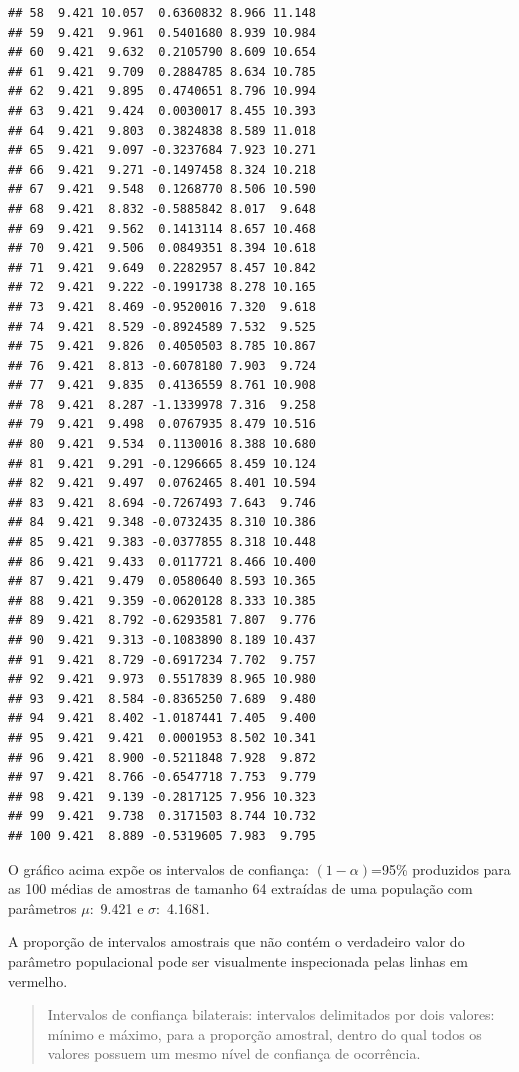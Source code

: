 \documentclass[
]{book}
\begin{document}
\begin{verbatim}
## 58  9.421 10.057  0.6360832 8.966 11.148
## 59  9.421  9.961  0.5401680 8.939 10.984
## 60  9.421  9.632  0.2105790 8.609 10.654
## 61  9.421  9.709  0.2884785 8.634 10.785
## 62  9.421  9.895  0.4740651 8.796 10.994
## 63  9.421  9.424  0.0030017 8.455 10.393
## 64  9.421  9.803  0.3824838 8.589 11.018
## 65  9.421  9.097 -0.3237684 7.923 10.271
## 66  9.421  9.271 -0.1497458 8.324 10.218
## 67  9.421  9.548  0.1268770 8.506 10.590
## 68  9.421  8.832 -0.5885842 8.017  9.648
## 69  9.421  9.562  0.1413114 8.657 10.468
## 70  9.421  9.506  0.0849351 8.394 10.618
## 71  9.421  9.649  0.2282957 8.457 10.842
## 72  9.421  9.222 -0.1991738 8.278 10.165
## 73  9.421  8.469 -0.9520016 7.320  9.618
## 74  9.421  8.529 -0.8924589 7.532  9.525
## 75  9.421  9.826  0.4050503 8.785 10.867
## 76  9.421  8.813 -0.6078180 7.903  9.724
## 77  9.421  9.835  0.4136559 8.761 10.908
## 78  9.421  8.287 -1.1339978 7.316  9.258
## 79  9.421  9.498  0.0767935 8.479 10.516
## 80  9.421  9.534  0.1130016 8.388 10.680
## 81  9.421  9.291 -0.1296665 8.459 10.124
## 82  9.421  9.497  0.0762465 8.401 10.594
## 83  9.421  8.694 -0.7267493 7.643  9.746
## 84  9.421  9.348 -0.0732435 8.310 10.386
## 85  9.421  9.383 -0.0377855 8.318 10.448
## 86  9.421  9.433  0.0117721 8.466 10.400
## 87  9.421  9.479  0.0580640 8.593 10.365
## 88  9.421  9.359 -0.0620128 8.333 10.385
## 89  9.421  8.792 -0.6293581 7.807  9.776
## 90  9.421  9.313 -0.1083890 8.189 10.437
## 91  9.421  8.729 -0.6917234 7.702  9.757
## 92  9.421  9.973  0.5517839 8.965 10.980
## 93  9.421  8.584 -0.8365250 7.689  9.480
## 94  9.421  8.402 -1.0187441 7.405  9.400
## 95  9.421  9.421  0.0001953 8.502 10.341
## 96  9.421  8.900 -0.5211848 7.928  9.872
## 97  9.421  8.766 -0.6547718 7.753  9.779
## 98  9.421  9.139 -0.2817125 7.956 10.323
## 99  9.421  9.738  0.3171503 8.744 10.732
## 100 9.421  8.889 -0.5319605 7.983  9.795
\end{verbatim}

\hfill\break

O gráfico acima expõe os intervalos de confiança: \((1-\alpha)\)=95\% produzidos para as 100 médias de amostras de tamanho 64 extraídas de uma população com parâmetros \(\mu:\) 9.421 e \(\sigma:\) 4.1681.

\hfill\break

A proporção de intervalos amostrais que não contém o verdadeiro valor do parâmetro populacional pode ser visualmente inspecionada pelas linhas em vermelho.

\hfill\break

\begin{quote}
Intervalos de confiança bilaterais: intervalos delimitados por dois valores: mínimo e máximo, para a proporção amostral, dentro do qual todos os valores possuem um mesmo nível de confiança de ocorrência.
\end{quote}
\end{document}
